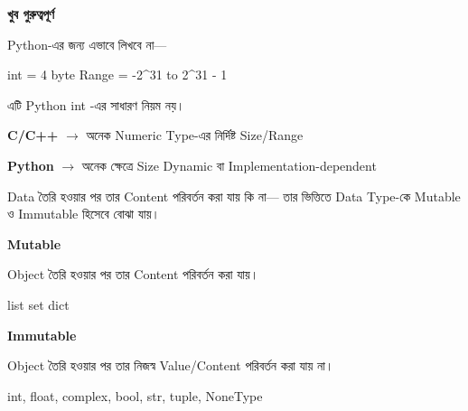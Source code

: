 \begin{rememberbox}

\textbf{\color{deepOrange}খুব গুরুত্বপূর্ণ}

Python-এর জন্য এভাবে লিখবে না—

\begin{center}
\textenglish{\ttfamily int = 4 byte}
\qquad
\textenglish{\ttfamily Range = -2\textasciicircum31 to 2\textasciicircum31 - 1}
\end{center}

এটি Python
\textenglish{\ttfamily int}
-এর সাধারণ নিয়ম নয়।

\begin{center}

\textbf{C/C++}
\(\longrightarrow\)
অনেক Numeric Type-এর নির্দিষ্ট Size/Range

\medskip

\textbf{Python}
\(\longrightarrow\)
অনেক ক্ষেত্রে Size Dynamic বা Implementation-dependent

\end{center}

\end{rememberbox}



Data তৈরি হওয়ার পর তার Content পরিবর্তন করা যায় কি না—
তার ভিত্তিতে Data Type-কে Mutable ও Immutable হিসেবে বোঝা যায়।

\noindent
\begin{minipage}[t]{0.49\linewidth}

\begin{definitionbox}

\textbf{\color{darkTeal}Mutable}

Object তৈরি হওয়ার পর তার Content পরিবর্তন করা যায়।

\begin{center}
\textenglish{\ttfamily list}
\qquad
\textenglish{\ttfamily set}
\qquad
\textenglish{\ttfamily dict}
\end{center}

\end{definitionbox}

\end{minipage}
\hfill
\begin{minipage}[t]{0.49\linewidth}

\begin{definitionbox}

\textbf{\color{darkTeal}Immutable}

Object তৈরি হওয়ার পর তার নিজস্ব Value/Content পরিবর্তন করা যায় না।

\begin{center}
\textenglish{\ttfamily int, float, complex, bool, str, tuple, NoneType}
\end{center}

\end{definitionbox}

\end{minipage}

